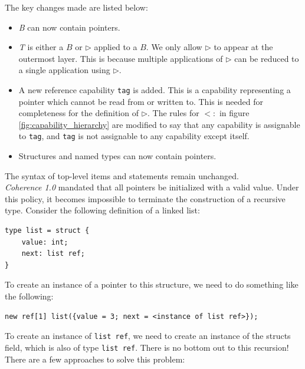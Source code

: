 \documentclass[a4paper,12pt,fleqn]{article}
\begin{document}
The key changes made are listed below:
\begin{itemize}
  \item \textit{B} can now contain pointers.
  \item \textit{T} is either a $B$ or $\triangleright$ applied to a $B$. We only allow $\triangleright$ to appear at the outermost layer. This is because multiple applications of $\triangleright$ can be reduced to a single application using $\triangleright$.
  \item A new reference capability \texttt{tag} is added. This is a capability representing a pointer which cannot be read from or written to. This is needed for completeness for the definition of $\triangleright$. The rules for $<:$ in figure \ref{fig:capability_hierarchy} are modified to say that any capability is assignable to \texttt{tag}, and \texttt{tag} is not assignable to any capability except itself.
  \item Structures and named types can now contain pointers.
\end{itemize}
The syntax of top-level items and statements remain unchanged. \\
\textit{Coherence 1.0} mandated that all pointers be initialized with a valid value. Under this policy, it becomes impossible to terminate the construction of a recursive type. Consider the following definition of a linked list:
\begin{lstlisting}
type list = struct {
    value: int;
    next: list ref;
}
\end{lstlisting}
To create an instance of a pointer to this structure, we need to do something like the following:
\begin{lstlisting}
new ref[1] list({value = 3; next = <instance of list ref>});
\end{lstlisting}
To create an instance of \texttt{list ref}, we need to create an instance of the structs field, which is also of type \texttt{list ref}. There is no bottom out to this recursion! There are a few approaches to solve this problem:
\end{document}
